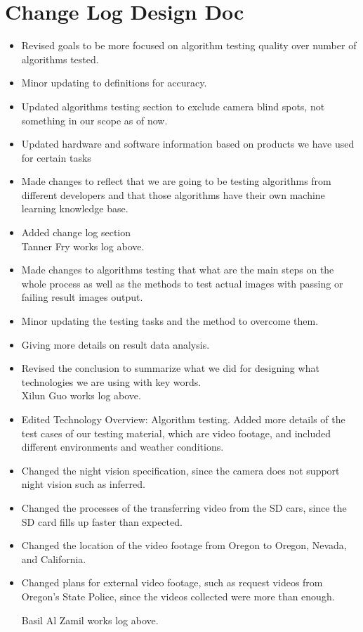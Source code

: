 \documentclass[10pt,draftclsnofoot,onecolumn,journal,compsoc]{IEEEtran}
\begin{document}
\section{Change Log Design Doc}
\begin{itemize}
	\item Revised goals to be more focused on algorithm testing quality over number of algorithms tested.
	\item Minor updating to definitions for accuracy.
	\item Updated algorithms testing section to exclude camera blind spots, not something in our scope as of now.
	\item Updated hardware and software information based on products we have used for certain tasks
	\item Made changes to reflect that we are going to be testing algorithms from different developers and that those algorithms have their own machine learning knowledge base.
	\item Added change log section\\
	
	Tanner Fry works log above.\\
	
	\item Made changes to algorithms testing that what are the main steps on the whole process as well as the methods to test actual images with passing or failing result images output.
	\item Minor updating the testing tasks and the method to overcome them.
	\item Giving more details on result data analysis.
	\item Revised the conclusion to summarize what we did for designing what technologies we are using with key words.\\
	
	Xilun Guo works log above.\\
	
	\item Edited Technology Overview: Algorithm testing. Added more details of the test cases of our testing material, which are video footage, and included different environments and weather conditions. 
	\item Changed the night vision specification, since the camera does not support night vision such as inferred.
	\item Changed the processes of the transferring video from the SD cars, since the SD card fills up faster than expected.
	\item Changed the location of the video footage from Oregon to Oregon, Nevada, and California.
	\item Changed plans for external video footage, such as request videos from Oregon’s State Police, since the videos collected were more than enough.
	
	Basil Al Zamil works log above.\\
	
\end{itemize}
\end{document}
